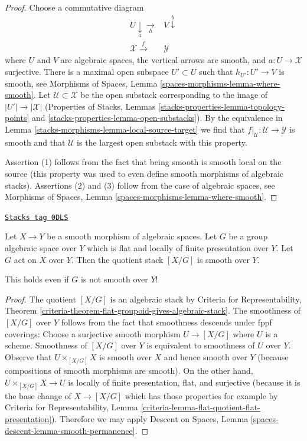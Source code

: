 \begin{proof}
Choose a commutative diagram
$$
\begin{array}{cc}U \underset{a}{\downarrow}\underset{h}{\longrightarrow} & V \overset{b}{\downarrow} \\ \mathcal{X} \overset{f}{\longrightarrow} & \mathcal{Y}\end{array}
$$
where $U$ and $V$ are algebraic spaces, the vertical arrows are smooth,
and $a : U \to \mathcal{X}$ surjective. There is a maximal open subspace
$U' \subset U$ such that $h_{U'} : U' \to V$ is smooth, see
Morphisms of Spaces, Lemma \ref{spaces-morphisms-lemma-where-smooth}.
Let $\mathcal{U} \subset \mathcal{X}$ be the open substack
corresponding to the image of $|U'| \to |\mathcal{X}|$
(Properties of Stacks, Lemmas \ref{stacks-properties-lemma-topology-points} and
\ref{stacks-properties-lemma-open-substacks}).
By the equivalence in Lemma \ref{stacks-morphisms-lemma-local-source-target}
we find that $f|_\mathcal{U} : \mathcal{U} \to \mathcal{Y}$ is smooth
and that $\mathcal{U}$ is the largest open substack with this
property.

\medskip\noindent
Assertion (1) follows from the fact that being smooth
is smooth local on the source (this property was used to even define
smooth morphisms of algebraic stacks).
Assertions (2) and (3) follow from the case of algebraic spaces, see
Morphisms of Spaces, Lemma \ref{spaces-morphisms-lemma-where-smooth}.
\end{proof}

\begin{lemma}
\label{stacks-morphisms-lemma-smooth-quotient-stack}
\href{https://stacks.math.columbia.edu/tag/0DLS}{\texttt{Stacks tag 0DLS}}

Let $X \to Y$ be a smooth morphism of algebraic spaces.
Let $G$ be a group algebraic space over $Y$ which is flat
and locally of finite presentation over $Y$. Let $G$ act on $X$ over $Y$.
Then the quotient stack $[X/G]$ is smooth over $Y$.
\end{lemma}

This holds even if $G$ is not smooth over $Y$!

\begin{proof}
The quotient $[X/G]$ is an algebraic stack by
Criteria for Representability, Theorem
\ref{criteria-theorem-flat-groupoid-gives-algebraic-stack}.
The smoothness of $[X/G]$ over $Y$ follows from the fact that smoothness
descends under fppf coverings:
Choose a surjective smooth morphism $U \to [X/G]$ where $U$ is a scheme.
Smoothness of $[X/G]$ over $Y$ is equivalent to smoothness of $U$ over $Y$.
Observe that $U \times_{[X/G]} X$ is smooth over $X$ and hence smooth
over $Y$ (because compositions of smooth morphisms are smooth).
On the other hand, $U \times_{[X/G]} X \to U$ is locally of
finite presentation, flat, and surjective (because it is
the base change of $X \to [X/G]$ which has those properties
for example by Criteria for Representability, Lemma
\ref{criteria-lemma-flat-quotient-flat-presentation}).
Therefore we may apply Descent on Spaces,
Lemma \ref{spaces-descent-lemma-smooth-permanence}.
\end{proof}

